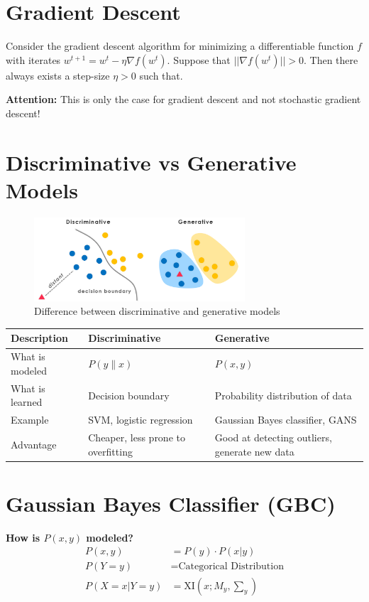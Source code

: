 \documentclass{article}
\begin{document}
\section{Gradient Descent}
Consider the gradient descent algorithm for minimizing a differentiable function $f$ with iterates $w^{t + 1} = w^{t} - \eta \nabla f(w^t)$. Suppose that $||\nabla f(w^t)|| > 0$. Then there always exists a step-size $\eta > 0$ such that.

\textbf{Attention:} This is only the case for gradient descent and not stochastic gradient descent!

\section{Discriminative vs Generative Models}
\begin{figure}[h]
    \centering
    \includegraphics[width=0.7\textwidth]{assets/dis_vs_gen.png}
    \caption{Difference between discriminative and generative models}
\end{figure}

\begin{center}
\begin{tabular}{|l|l|l|}
\hline
\textbf{Description} & \textbf{Discriminative} & \textbf{Generative} \\
\hline
What is modeled & $P(y \| x)$ & $P(x, y)$ \\
What is learned & Decision boundary & Probability distribution of data \\
Example & SVM, logistic regression & Gaussian Bayes classifier, GANS \\
Advantage & Cheaper, less prone to overfitting & Good at detecting outliers, generate new data \\
\hline
\end{tabular}
\end{center}

\section{Gaussian Bayes Classifier (GBC)}
\textbf{How is $P(x, y)$ modeled?}
\begin{align*}
P(x, y) &= P(y) \cdot P(x | y) \\
P(Y = y) &= \text{Categorical Distribution} \\
P(X = x | Y = y) &= \text{XI}(x; M_y, \sum_y)
\end{align*}
\end{document}
